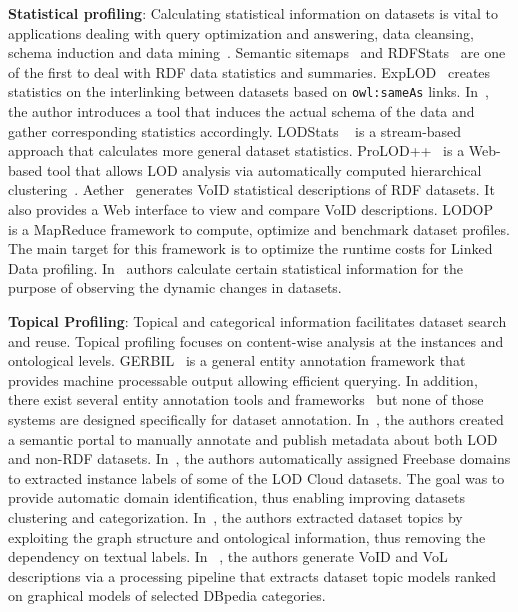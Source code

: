 \documentclass[runningheads,a4paper]{../../Util/LaTEX/llncs}
\begin{document}
\textbf{Statistical profiling}: Calculating statistical information on datasets is vital to applications dealing with query optimization and answering, data cleansing, schema induction and data mining~\cite{Jentzsch:ISWC:14,Frosterus:Springer:11,Lalithsena:WI:13}. Semantic sitemaps~\cite{Cyganiak:ESWC:08} and RDFStats~\cite{Lanegger:DEXA:09} are one of the first to deal with RDF data statistics and summaries. ExpLOD~\cite{Khatchadourian:ESWC:10} creates statistics on the interlinking between datasets based on \texttt{owl:sameAs} links. In~\cite{Li:WISM:12}, the author introduces a tool that induces the actual schema of the data and gather corresponding statistics accordingly. LODStats ~\cite{Auer:EKAW:12} is a stream-based approach that calculates more general dataset statistics. ProLOD++~\cite{Abedjan:ICDE:14} is a Web-based tool that allows LOD analysis via automatically computed hierarchical clustering~\cite{Bohm:ICDEW:10}. Aether~\cite{Makela:ESWC:14} generates VoID statistical descriptions of RDF datasets. It also provides a Web interface to view and compare VoID descriptions. LODOP~\cite{Forchhammer:PROFILES:14} is a MapReduce framework to compute, optimize and benchmark dataset profiles. The main target for this framework is to optimize the runtime costs for Linked Data profiling. In~\cite{Kaafer:ESWC:13} authors calculate certain statistical information for the purpose of observing the dynamic changes in datasets.

\textbf{Topical Profiling}: Topical and categorical information facilitates dataset search and reuse. Topical profiling focuses on content-wise analysis at the instances and ontological levels. GERBIL~\cite{Usbeck:WWW:15} is a general entity annotation framework that provides machine processable output allowing efficient querying. In addition, there exist several entity annotation tools and frameworks~\cite{Cornolti:WWW:13} but none of those systems are designed specifically for dataset annotation. In~\cite{Frosterus:ESWC:11}, the authors created a semantic portal to manually annotate and publish metadata about both LOD and non-RDF datasets. In~\cite{Lalithsena:WI:13}, the authors automatically assigned Freebase domains to extracted instance labels of some of the LOD Cloud datasets. The goal was to provide automatic domain identification, thus enabling improving datasets clustering and categorization. In~\cite{Bohm:CIKM:12}, the authors extracted dataset topics by exploiting the graph structure and ontological information, thus removing the dependency on textual labels. In ~\cite{Fetahu:ESWC:14}, the authors generate VoID and VoL descriptions via a processing pipeline that extracts dataset topic models ranked on graphical models of selected DBpedia categories.
\end{document}
